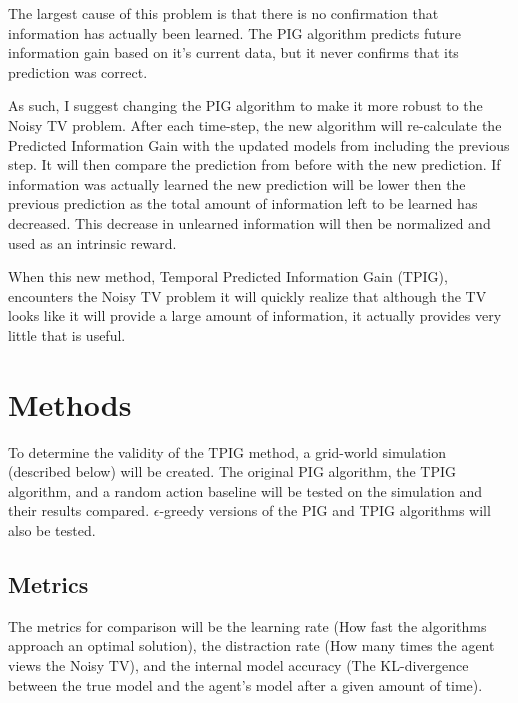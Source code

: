 \documentclass[12pt]{thesis}
\begin{document}
The largest cause of this problem is that there is no confirmation that information has actually been learned. The PIG algorithm predicts future information gain based on it’s current data, but it never confirms that its prediction was correct.

As such, I suggest changing the PIG algorithm to make it more robust to the Noisy TV problem. After each time-step, the new algorithm will re-calculate the Predicted Information Gain with the updated models from including the previous step. It will then compare the prediction from before with the new prediction. If information was actually learned the new prediction will be lower then the previous prediction as the total amount of information left to be learned has decreased. This decrease in unlearned information will then be normalized and used as an intrinsic reward.

When this new method, Temporal Predicted Information Gain (TPIG), encounters the Noisy TV problem it will quickly realize that although the TV looks like it will provide a large amount of information, it actually provides very little that is useful.

\section{Methods}
To determine the validity of the TPIG method, a grid-world simulation (described below) will be created. The original PIG algorithm, the TPIG algorithm, and a random action baseline will be tested on the simulation and their results compared. $\epsilon$-greedy versions of the PIG and TPIG algorithms will also be tested.

\subsection{Metrics}
The metrics for comparison will be the learning rate (How fast the algorithms approach an optimal solution), the distraction rate (How many times the agent views the Noisy TV), and the internal model accuracy (The KL-divergence between the true model and the agent's model after a given amount of time).

\end{document}
